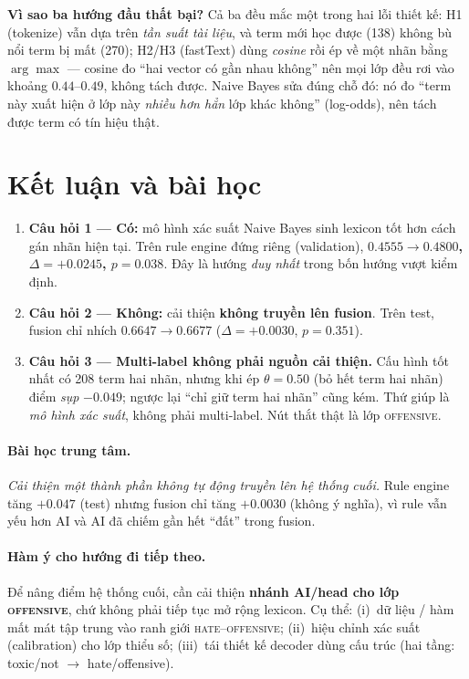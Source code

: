 \documentclass[11pt,a4paper]{article}
\newcommand{\ok}[1]{\textcolor{cok}{\textbf{#1}}}
\newcommand{\bad}[1]{\textcolor{cfail}{\textbf{#1}}}
\begin{document}
\textbf{Vì sao ba hướng đầu thất bại?}  Cả ba đều mắc một trong hai lỗi thiết kế:
H1 (tokenize) vẫn dựa trên \emph{tần suất tài liệu}, và term mới học được (138)
không bù nổi term bị mất (270); H2/H3 (fastText) dùng \emph{cosine} rồi ép về
một nhãn bằng $\arg\max$ --- cosine đo ``hai vector có gần nhau không'' nên mọi
lớp đều rơi vào khoảng $0.44$--$0.49$, không tách được.  Naive Bayes sửa đúng
chỗ đó: nó đo ``term này xuất hiện ở lớp này \emph{nhiều hơn hẳn} lớp khác
không'' (log-odds), nên tách được term có tín hiệu thật.

\section{Kết luận và bài học}
\label{sec:conclusion}

\begin{enumerate}[leftmargin=1.6em]
  \item \textbf{Câu hỏi 1 --- Có:} mô hình xác suất Naive Bayes sinh lexicon tốt
  hơn cách gán nhãn hiện tại.  Trên rule engine đứng riêng (validation),
  \ok{$0.4555\to0.4800$, $\Delta=+0.0245$, $p=0.038$}.  Đây là hướng \emph{duy
  nhất} trong bốn hướng vượt kiểm định.
  \item \textbf{Câu hỏi 2 --- Không:} cải thiện \bad{không truyền lên fusion}.
  Trên test, fusion chỉ nhích $0.6647\to0.6677$ ($\Delta=+0.0030$, $p=0.351$).
  \item \textbf{Câu hỏi 3 --- Multi-label không phải nguồn cải thiện.}  Cấu hình
  tốt nhất có 208 term hai nhãn, nhưng khi ép $\theta=0.50$ (bỏ hết term hai
  nhãn) điểm \emph{sụp} $-0.049$; ngược lại ``chỉ giữ term hai nhãn'' cũng kém.
  Thứ giúp là \emph{mô hình xác suất}, không phải multi-label.  Nút thắt thật là
  lớp \textsc{offensive}.
\end{enumerate}

\paragraph{Bài học trung tâm.}
\emph{Cải thiện một thành phần không tự động truyền lên hệ thống cuối.}  Rule
engine tăng $+0.047$ (test) nhưng fusion chỉ tăng $+0.0030$ (không ý nghĩa), vì
rule vẫn yếu hơn AI và AI đã chiếm gần hết ``đất'' trong fusion.

\paragraph{Hàm ý cho hướng đi tiếp theo.}
Để nâng điểm hệ thống cuối, cần cải thiện \textbf{nhánh AI/head cho lớp
\textsc{offensive}}, chứ không phải tiếp tục mở rộng lexicon.  Cụ thể: (i)~dữ
liệu / hàm mất mát tập trung vào ranh giới \textsc{hate}--\textsc{offensive};
(ii)~hiệu chỉnh xác suất (calibration) cho lớp thiểu số; (iii)~tái thiết kế
decoder dùng cấu trúc (hai tầng: toxic/not $\to$ hate/offensive).
\end{document}
